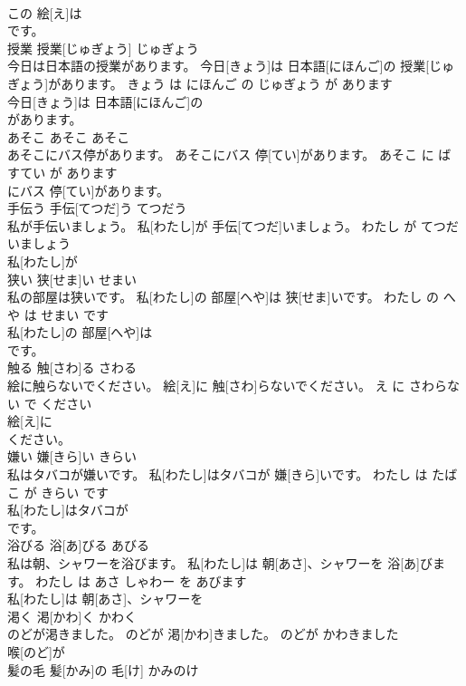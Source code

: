 \documentclass[8pt]{extreport}
\begin{document}
\begin{CJK}{UTF8}{min}
\\	この 絵[え]は
\\	です。		
\\	授業	授業[じゅぎょう]	じゅぎょう	
\\	今日は日本語の授業があります。	今日[きょう]は 日本語[にほんご]の 授業[じゅぎょう]があります。	きょう は にほんご の じゅぎょう が あります	
\\	今日[きょう]は 日本語[にほんご]の
\\	があります。		
\\	あそこ	あそこ	あそこ	
\\	あそこにバス停があります。	あそこにバス 停[てい]があります。	あそこ に ばすてい が あります	
\\	にバス 停[てい]があります。		
\\	手伝う	手伝[てつだ]う	てつだう	
\\	私が手伝いましょう。	私[わたし]が 手伝[てつだ]いましょう。	わたし が てつだいましょう	
\\	私[わたし]が
\\	狭い	狭[せま]い	せまい	
\\	私の部屋は狭いです。	私[わたし]の 部屋[へや]は 狭[せま]いです。	わたし の へや は せまい です	
\\	私[わたし]の 部屋[へや]は
\\	です。		
\\	触る	触[さわ]る	さわる	
\\	絵に触らないでください。	絵[え]に 触[さわ]らないでください。	え に さわらない で ください	
\\	絵[え]に
\\	ください。		
\\	嫌い	嫌[きら]い	きらい	
\\	私はタバコが嫌いです。	私[わたし]はタバコが 嫌[きら]いです。	わたし は たばこ が きらい です	
\\	私[わたし]はタバコが
\\	です。		
\\	浴びる	浴[あ]びる	あびる	
\\	私は朝、シャワーを浴びます。	私[わたし]は 朝[あさ]、シャワーを 浴[あ]びます。	わたし は あさ しゃわー を あびます	
\\	私[わたし]は 朝[あさ]、シャワーを
\\	渇く	渇[かわ]く	かわく	
\\	のどが渇きました。	のどが 渇[かわ]きました。	のどが かわきました	
\\	喉[のど]が
\\	髪の毛	髪[かみ]の 毛[け]	かみのけ	

\end{CJK}
\end{document}
